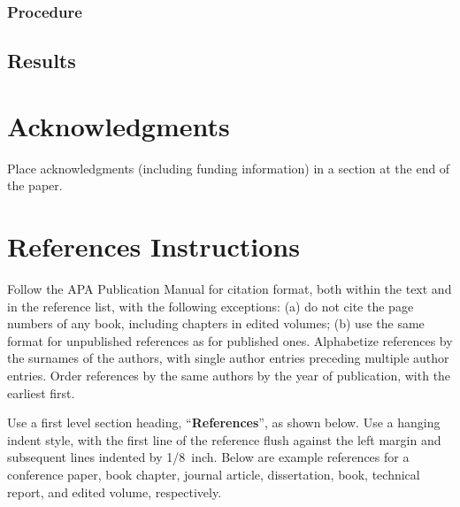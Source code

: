 \documentclass[10pt,letterpaper]{article}
\begin{document}
\subsubsection{Procedure}
\subsection{Results}


\section{Acknowledgments}

Place acknowledgments (including funding information) in a section at
the end of the paper.


\section{References Instructions}

Follow the APA Publication Manual for citation format, both within the
text and in the reference list, with the following exceptions: (a) do
not cite the page numbers of any book, including chapters in edited
volumes; (b) use the same format for unpublished references as for
published ones. Alphabetize references by the surnames of the authors,
with single author entries preceding multiple author entries. Order
references by the same authors by the year of publication, with the
earliest first.

Use a first level section heading, ``{\bf References}'', as shown
below. Use a hanging indent style, with the first line of the
reference flush against the left margin and subsequent lines indented
by 1/8~inch. Below are example references for a conference paper, book
chapter, journal article, dissertation, book, technical report, and
edited volume, respectively.



\setlength{\bibleftmargin}{.125in}
\setlength{\bibindent}{-\bibleftmargin}


\end{document}

